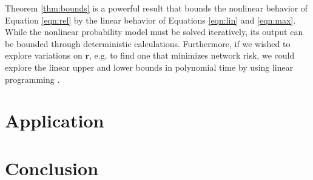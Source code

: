 \documentclass{article}
\begin{document}
Theorem \ref{thm:bounds} is a powerful result that bounds the nonlinear behavior of Equation \ref{eqn:rel} by the linear behavior of Equations \ref{eqn:lin} and \ref{eqn:max}. While the nonlinear probability model must be solved iteratively, its output can be bounded through deterministic calculations. Furthermore, if we wished to explore variations on $\mathbf{r}$, e.g. to find one that minimizes network risk, we could explore the linear upper and lower bounds in polynomial time by using linear programming \citep{lp}.

\section{Application}
\label{section:application}

\section{Conclusion}



\end{document}

